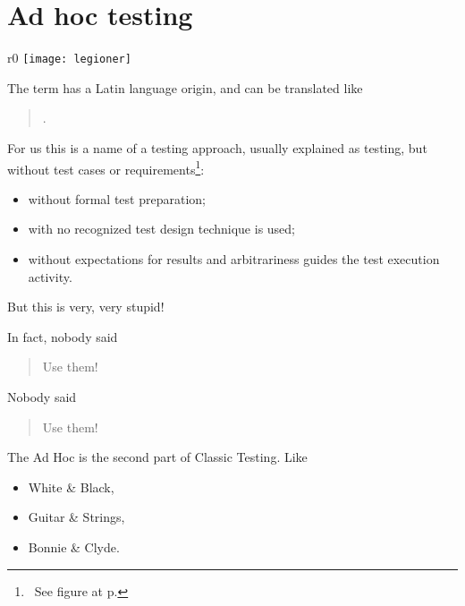 \section{Ad hoc testing}
\label{sec:Ad hoc testing}


\begin{wrapfigure}{r}{0\linewidth}
\texttt{[image: legioner]} %
\caption{}
\label{ris:legioner}
\end{wrapfigure}

The term  has a Latin language origin, and can be translated like 

	\begin{quote}
	.
	\end{quote} 

For us this is a name of a testing approach, usually explained as testing, but without test cases or requirements\footnote{~See figure  at p.\pageref{fig:ClassicAdHocExploratoryTesting}}:

\begin{itemize}
\item without formal test preparation;
\item with no recognized test design technique is used;
\item without expectations for results and arbitrariness guides the test execution activity. 
\end{itemize}

But this is very, very stupid!

In fact, nobody said 
\begin{quote}
Use them!
\end{quote} 

Nobody said 
\begin{quote}
Use them!
\end{quote} 

The Ad Hoc is the second part of Classic Testing. Like 
\begin{itemize}
\item 
White \& Black, 
\item 
Guitar \& Strings, 
\item 
Bonnie \& Clyde.
\end{itemize}

